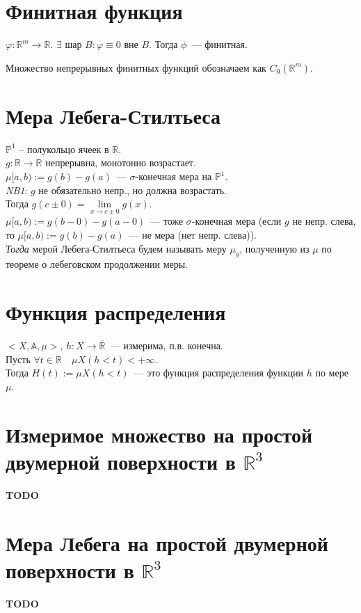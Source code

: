\documentclass[paper=a4, fontsize=17pt]{article}
\begin{document}
	\section{Финитная функция}
	$\varphi : \mathbb{R}^m \rightarrow \mathbb{R}$. $\exists$ шар $B: \varphi \equiv 0 $ вне $B$. Тогда $\phi$~--- финитная.
    
    Множество непрерывных финитных функций обозначаем как $C_0(\mathbb{R}^m)$.

	\section{Мера Лебега-Стилтьеса}
	$\mathbb{P}^1$ -- полукольцо ячеек в $\mathds{R}$. \\
	$g : \mathbb{R} \rightarrow \mathbb{R}$ непрерывна, монотонно возрастает. \\
	$\mu [a, b):=g(b) - g(a)$~--- $\sigma$-конечная мера на $\mathbb{P}^1$. \\

	\emph{NB1}: $g$ не обязательно непр., но должна возрастать. \\
	Тогда $g(c \pm 0)=\lim\limits_{x \rightarrow c \pm 0} g(x)$. \\
	$\mu [a, b):=g(b - 0) - g(a - 0)$~--- тоже $\sigma$-конечная мера (если $g$ не непр. слева, то $\mu [a, b):=g(b) - g(a)$~--- не мера (нет непр. слева)). \\


	\emph{Тогда} мерой Лебега-Стилтьеса будем называть меру $\mu_g$, полученную из $\mu$ по теореме о лебеговском продолжении меры.

	\section{Функция распределения}
	$<X, \mathds{A}, \mu> $, $h: X \rightarrow \overline{\mathbb{R}}$~--- измерима, п.в. конечна.\\

	Пусть $\forall t \in \mathbb{R}\quad \mu X(h < t) < +\infty$.\\
	Тогда $H(t):=\mu X(h < t)$~--- это функция распределения функции $h$ по мере $\mu$.

	\section{Измеримое множество на простой двумерной поверхности в $\mathds{R}^3$}
	{\color{red} \textbf{TODO}}

	\section{Мера Лебега на простой двумерной поверхности в $\mathds{R}^3$}
	{\color{red} \textbf{TODO}}
\end{document}
